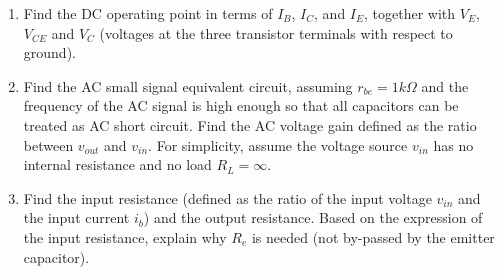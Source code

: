 \begin{enumerate}

\begin{enumerate}
\item Find the DC operating point in terms of $I_B$, $I_C$, and $I_E$, 
  together with $V_E$, $V_{CE}$ and $V_C$ (voltages at the three transistor 
  terminals with respect to ground). 
\item Find the AC small signal equivalent circuit, assuming $r_{be}=1k\Omega$
  and the frequency of the AC signal is high enough so that all capacitors 
  can be treated as AC short circuit. Find the AC voltage gain defined as the 
  ratio between $v_{out}$ and $v_{in}$. For simplicity, assume the voltage
  source $v_{in}$ has no internal resistance and no load $R_L=\infty$.
\item Find the input resistance (defined as the ratio of the input voltage
  $v_{in}$ and the input current $i_b$) and the output resistance. Based on
  the expression of the input resistance, explain why $R_e$ is needed (not
  by-passed by the emitter capacitor).
\end{enumerate}

% 
% 
% 
% 
% 
% 
% 
% 
%   
% 
% 



\end{enumerate}
